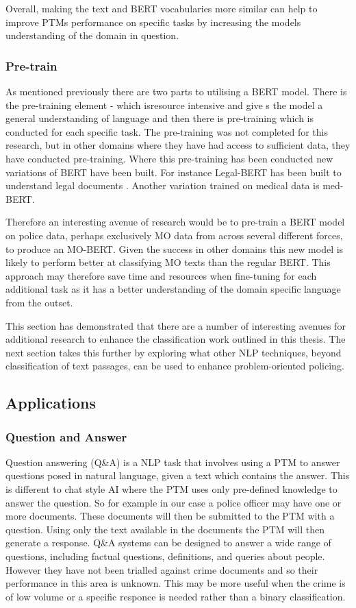 Overall, making the text and BERT vocabularies more similar can help to improve PTMs performance on specific tasks by increasing the models understanding of the domain in question.

\subsubsection{Pre-train} As mentioned previously there are two parts to utilising a BERT model. There is the pre-training element - which isresource intensive and  give s the model a general understanding of language and then there is pre-training which is  conducted for each specific task. The pre-training was not completed for this research, but in other domains where they have had access to sufficient data, they have conducted pre-training. Where this pre-training has been conducted new variations of BERT have been built. For instance Legal-BERT has been built to understand legal documents \parencite{legal_bert}. Another variation trained on medical data is med-BERT. 

Therefore an interesting avenue of research would be to pre-train a BERT model on police data, perhaps exclusively MO data from across several different forces, to produce an MO-BERT. Given the success in other domains this new model is likely to perform better at classifying MO texts than the regular BERT. This approach may therefore save time and resources when fine-tuning for each additional task as it has a better understanding of the domain specific language from the outset.

This section has demonstrated that there are a number of interesting avenues for additional research to enhance the classification work outlined in this thesis. The next section takes this further by exploring what other NLP techniques, beyond classification of text passages, can be used to enhance problem-oriented policing. 

\subsection{Applications}

\subsubsection{Question and Answer} Question answering (Q\&A) is a NLP task that involves using a PTM to answer questions posed in natural language, given a text which contains the answer. This is different to chat style AI where the PTM uses only pre-defined knowledge to answer the question. So for example in our case a police officer may have one or more documents. These documents will then be submitted to the PTM with a question. Using only the text available in the documents the PTM will then generate a response. Q\&A systems can be designed to answer a wide range of questions, including factual questions, definitions, and queries about people. However they have not been trialled against crime documents and so their performance in this area is unknown. This may be more useful when the crime is of low volume or a specific responce is needed rather than a binary classification.

